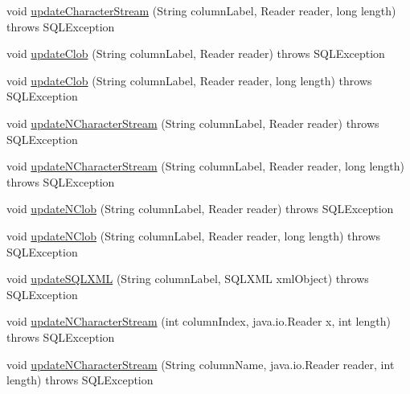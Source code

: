 \begin{DoxyCompactItemize}
\item 
void \mbox{\hyperlink{classcom_1_1mysql_1_1cj_1_1jdbc_1_1result_1_1_updatable_result_set_a6947c357b09facf8e8d34cd33d29aabe}{update\+Character\+Stream}} (String column\+Label, Reader reader, long length)  throws S\+Q\+L\+Exception 
\item 
void \mbox{\hyperlink{classcom_1_1mysql_1_1cj_1_1jdbc_1_1result_1_1_updatable_result_set_a27826277e4e1cd8e5677b9ca98590102}{update\+Clob}} (String column\+Label, Reader reader)  throws S\+Q\+L\+Exception 
\item 
void \mbox{\hyperlink{classcom_1_1mysql_1_1cj_1_1jdbc_1_1result_1_1_updatable_result_set_a0758d63169ecf68929c20de544287ea8}{update\+Clob}} (String column\+Label, Reader reader, long length)  throws S\+Q\+L\+Exception 
\item 
void \mbox{\hyperlink{classcom_1_1mysql_1_1cj_1_1jdbc_1_1result_1_1_updatable_result_set_afea62357570f31ddce94df9e1db57661}{update\+N\+Character\+Stream}} (String column\+Label, Reader reader)  throws S\+Q\+L\+Exception 
\item 
void \mbox{\hyperlink{classcom_1_1mysql_1_1cj_1_1jdbc_1_1result_1_1_updatable_result_set_abd23dd8d06544d5af1fb0f1feaf2e333}{update\+N\+Character\+Stream}} (String column\+Label, Reader reader, long length)  throws S\+Q\+L\+Exception 
\item 
void \mbox{\hyperlink{classcom_1_1mysql_1_1cj_1_1jdbc_1_1result_1_1_updatable_result_set_a15e500bb1292fcc9e0bfc762be9c1b11}{update\+N\+Clob}} (String column\+Label, Reader reader)  throws S\+Q\+L\+Exception 
\item 
void \mbox{\hyperlink{classcom_1_1mysql_1_1cj_1_1jdbc_1_1result_1_1_updatable_result_set_a33690e16498428c09988470ac90760b3}{update\+N\+Clob}} (String column\+Label, Reader reader, long length)  throws S\+Q\+L\+Exception 
\item 
void \mbox{\hyperlink{classcom_1_1mysql_1_1cj_1_1jdbc_1_1result_1_1_updatable_result_set_a910911d149fe953b542aa572ec84e049}{update\+S\+Q\+L\+X\+ML}} (String column\+Label, S\+Q\+L\+X\+ML xml\+Object)  throws S\+Q\+L\+Exception 
\item 
void \mbox{\hyperlink{classcom_1_1mysql_1_1cj_1_1jdbc_1_1result_1_1_updatable_result_set_a3fd97766c7077e7ca286aaf2054794ad}{update\+N\+Character\+Stream}} (int column\+Index, java.\+io.\+Reader x, int length)  throws S\+Q\+L\+Exception 
\item 
void \mbox{\hyperlink{classcom_1_1mysql_1_1cj_1_1jdbc_1_1result_1_1_updatable_result_set_aecac222109cc865ddbf1f66b415468c0}{update\+N\+Character\+Stream}} (String column\+Name, java.\+io.\+Reader reader, int length)  throws S\+Q\+L\+Exception 

\end{DoxyCompactItemize}
